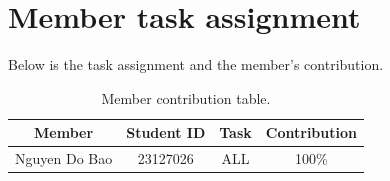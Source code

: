 \chapter{Member task assignment}\label{ch:appendix-assignments}

Below is the task assignment and the member's contribution.

\begin{table}[h]
\centering
\small
\begin{tabular}{cccc}
\toprule
Member & Student ID & Task & Contribution \\
\midrule
Nguyen Do Bao & 23127026 & ALL & 100\% \\
\bottomrule
\end{tabular}
\caption{Member contribution table.}\label{tab:assignments}
\end{table}